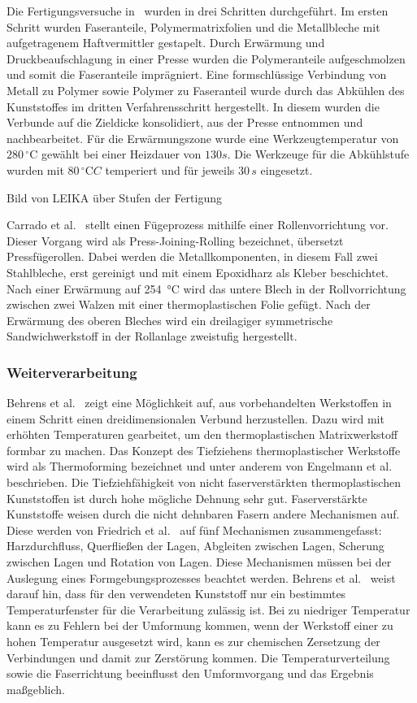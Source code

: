 Die Fertigungsversuche in~\cite{Wiedemann2017} wurden in drei Schritten durchgeführt.
Im ersten Schritt wurden Faseranteile, Polymermatrixfolien und die Metallbleche mit aufgetragenem Haftvermittler gestapelt.
Durch Erwärmung und Druckbeaufschlagung in einer Presse wurden die Polymeranteile aufgeschmolzen und somit die Faseranteile imprägniert.
Eine formschlüssige Verbindung von Metall zu Polymer sowie Polymer zu Faseranteil wurde durch das Abkühlen des Kunststoffes im dritten Verfahrensschritt hergestellt.
In diesem wurden die Verbunde auf die Zieldicke konsolidiert, aus der Presse entnommen und nachbearbeitet.
Für die Erwärmungszone wurde eine Werkzeugtemperatur von $280\, ^\circ \text{C}$ gewählt bei einer Heizdauer von $130 s$.
Die Werkzeuge für die Abkühlstufe wurden mit $80\, ^\circ\text{C} C$ temperiert und für jeweils $30\, s$ eingesetzt\cite{Wiedemann2017}.

Bild von LEIKA über Stufen der Fertigung

Carrado et al.~\cite{Carrado2010} stellt einen Fügeprozess mithilfe einer Rollenvorrichtung vor.
Dieser Vorgang wird als Press-Joining-Rolling bezeichnet, übersetzt Pressfügerollen.
Dabei werden die Metallkomponenten, in diesem Fall zwei Stahlbleche, erst gereinigt und mit einem Epoxidharz als Kleber beschichtet.
Nach einer Erwärmung auf \SI{254}{\degreeCelsius} wird das untere Blech in der Rollvorrichtung zwischen zwei Walzen mit einer thermoplastischen Folie gefügt.
Nach der Erwärmung des oberen Bleches wird ein dreilagiger symmetrische Sandwichwerkstoff in der Rollanlage zweistufig hergestellt.

\subsubsection{Weiterverarbeitung}

Behrens et al.~\cite{Behrens2014} zeigt eine Möglichkeit auf, aus vorbehandelten Werkstoffen in einem Schritt einen dreidimensionalen Verbund herzustellen.
Dazu wird mit erhöhten Temperaturen gearbeitet, um den thermoplastischen Matrixwerkstoff formbar zu machen.
Das Konzept des Tiefziehens thermoplastischer Werkstoffe wird als Thermoforming bezeichnet und unter anderem von Engelmann et al.~\cite{Engelmann2012} beschrieben.
Die Tiefziehfähigkeit von nicht faserverstärkten thermoplastischen Kunststoffen ist durch hohe mögliche Dehnung sehr gut.
Faserverstärkte Kunststoffe weisen durch die nicht dehnbaren Fasern andere Mechanismen auf.
Diese werden von Friedrich et al.~\cite{Friedrich1997} auf fünf Mechanismen zusammengefasst: Harzdurchfluss, Querfließen der Lagen, Abgleiten zwischen Lagen, Scherung zwischen Lagen und Rotation von Lagen.
Diese Mechanismen müssen bei der Auslegung eines Formgebungsprozesses beachtet werden.
Behrens et al.~\cite{Behrens2014} weist darauf hin, dass für den verwendeten Kunststoff nur ein bestimmtes Temperaturfenster für die Verarbeitung zulässig ist.
Bei zu niedriger Temperatur kann es zu Fehlern bei der Umformung kommen, wenn der Werkstoff einer zu hohen Temperatur ausgesetzt wird, kann es zur chemischen Zersetzung der Verbindungen und damit zur Zerstörung kommen.
Die Temperaturverteilung sowie die Faserrichtung beeinflusst den Umformvorgang und das Ergebnis maßgeblich.

